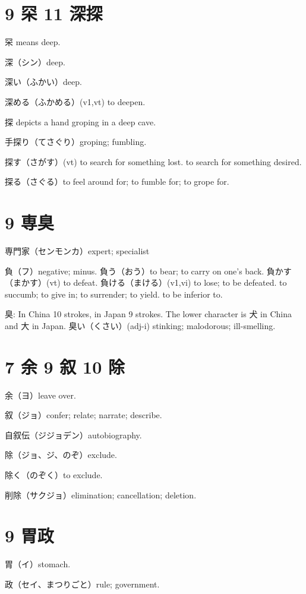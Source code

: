 \section{9 罙 11 深探}

罙 means deep.

深（シン）deep.

深い（ふかい）deep.

深める（ふかめる）(v1,vt) to deepen.

探 depicts a hand groping in a deep cave.

手探り（てさぐり）groping; fumbling.

探す（さがす）(vt)
to search for something lost.
to search for something desired.

探る（さぐる）to feel around for; to fumble for; to grope for.

\section{9 専臭}

専門家（センモンカ）expert; specialist

負（フ）negative; minus.
負う（おう）to bear; to carry on one's back.
負かす（まかす）(vt) to defeat.
負ける（まける）(v1,vi)
to lose; to be defeated.
to succumb; to give in; to surrender; to yield.
to be inferior to.

臭: In China 10 strokes, in Japan 9 strokes.
The lower character is 犬 in China and 大 in Japan.
臭い（くさい）(adj-i) stinking; malodorous; ill-smelling.

\section{7 余 9 叙 10 除}

余（ヨ）leave over.

叙（ジョ）confer; relate; narrate; describe.

自叙伝（ジジョデン）autobiography.

除（ジョ、ジ、のぞ）exclude.

除く（のぞく）to exclude.

削除（サクジョ）elimination; cancellation; deletion.

\section{9 胃政}

胃（イ）stomach.

政（セイ、まつりごと）rule; government.

